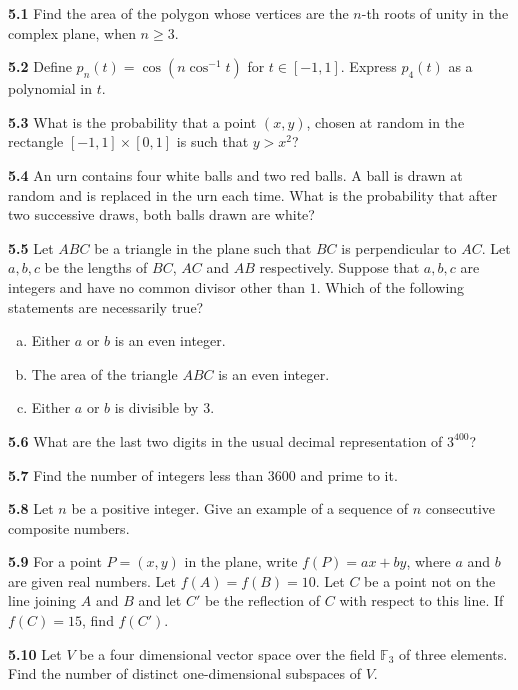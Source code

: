 \documentclass[11pt,a4paper]{article}
\newcommand{\F}{\mathbb{F}}
\newcommand{\qitem}[1]{\par\medskip\noindent\textbf{#1}\hspace{0.5em}}
\begin{document}
\qitem{5.1} Find the area of the polygon whose vertices are the $n$-th roots of unity in the complex plane, when $n \ge 3$.

\qitem{5.2} Define $p_n(t) = \cos(n \cos^{-1} t)$ for $t \in [-1, 1]$. Express $p_4(t)$ as a polynomial in $t$.

\qitem{5.3} What is the probability that a point $(x, y)$, chosen at random in the rectangle $[-1, 1] \times [0, 1]$ is such that $y > x^2$?

\qitem{5.4} An urn contains four white balls and two red balls. A ball is drawn at random and is replaced in the urn each time. What is the probability that after two successive draws, both balls drawn are white?

\qitem{5.5} Let $ABC$ be a triangle in the plane such that $BC$ is perpendicular to $AC$. Let $a, b, c$ be the lengths of $BC$, $AC$ and $AB$ respectively. Suppose that $a, b, c$ are integers and have no common divisor other than $1$. Which of the following statements are necessarily true?
\begin{enumerate}[a.]
  \item Either $a$ or $b$ is an even integer.
  \item The area of the triangle $ABC$ is an even integer.
  \item Either $a$ or $b$ is divisible by $3$.
\end{enumerate}

\qitem{5.6} What are the last two digits in the usual decimal representation of $3^{400}$?

\qitem{5.7} Find the number of integers less than $3600$ and prime to it.

\qitem{5.8} Let $n$ be a positive integer. Give an example of a sequence of $n$ consecutive composite numbers.

\qitem{5.9} For a point $P = (x, y)$ in the plane, write $f(P) = ax + by$, where $a$ and $b$ are given real numbers. Let $f(A) = f(B) = 10$. Let $C$ be a point not on the line joining $A$ and $B$ and let $C'$ be the reflection of $C$ with respect to this line. If $f(C) = 15$, find $f(C')$.

\qitem{5.10} Let $V$ be a four dimensional vector space over the field $\F_3$ of three elements. Find the number of distinct one-dimensional subspaces of $V$.
\end{document}
